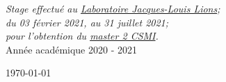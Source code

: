 \documentclass[ 
11pt, %
french, %
singlespacing, %
parskip, %
headsepline, %
openany, %
]{MastersDoctoralThesis} %
\theoremstyle{plain}
\numberwithin{theorem}{section}  %
\begin{document}
\begin{titlepage}
\begin{center}
\large \textit{Stage effectué au \href{https://www.ljll.math.upmc.fr/?lang=fr}{Laboratoire Jacques-Louis Lions};}\\[0.2cm]
\textit{du 03 février 2021, au 31 juillet 2021;}\\[0.2cm]
\textit{pour l'obtention du \href{https://docs.google.com/document/d/10JbbXeqqu5J2BjMkSQRNQ8Gx7xBPOClLKpvd7EBZT8U/edit}{master 2 CSMI}. }\\[0.2cm]

\vspace*{.04\textheight}
\large Année académique 2020 - 2021

\vfill

{\large \today}\\[4cm] %

\end{center}
\end{titlepage}

%
%
%
%
%
\end{document}
